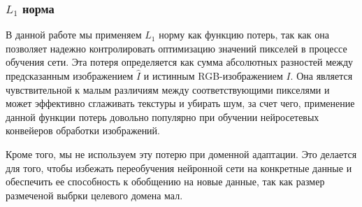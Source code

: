 \subsubsection{$L_1$ норма}

В данной работе мы применяем $L_1$ норму как функцию потерь, так как она позволяет надежно контролировать оптимизацию значений пикселей в процессе обучения сети. Эта потеря определяется как сумма абсолютных разностей между предсказанным изображением $\hat{I}$ и истинным RGB-изображением $I$. Она является чувствительной к малым различиям между соответствующими пикселями и может эффективно сглаживать текстуры и убирать шум, за счет чего, применение данной функции потерь довольно популярно при обучении нейросетевых конвейеров обработки изображений.

Кроме того, мы не используем эту потерю при доменной адаптации. Это делается для того, чтобы избежать переобучения нейронной сети на конкретные данные и обеспечить ее способность к обобщению на новые данные, так как размер размеченой выбрки целевого домена мал.
